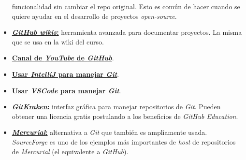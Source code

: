 \begin{itemize}
        funcionalidad sin cambiar el repo original.
        Esto es común de hacer cuando se quiere ayudar en el desarrollo de proyectos 
        \textit{open-source}.
      \item \href{https://guides.github.com/features/wikis/}{
        \textbf{\textit{GitHub wikis}:}} herramienta avanzada para documentar 
        proyectos.
        La misma que se usa en la wiki del curso. 
      \item \href{https://www.youtube.com/githubguides}{\textbf{Canal de 
        \textit{YouTube} de \textit{GitHub}}}.
      \item \href{https://www.youtube.com/watch?v=uUzRMOCBorg}{\textbf{Usar 
        \textit{IntelliJ} para manejar \textit{Git}}}.
      \item  \href{https://code.visualstudio.com/docs/editor/versioncontrol}{
        \textbf{Usar \textit{VSCode} para manejar \textit{Git}}}.
      \item \href{https://www.gitkraken.com}{\textbf{\textit{GitKraken}:}} interfaz 
        gráfica para manejar repositorios de \textit{Git}.
        Pueden obtener una licencia gratis postulando a los beneficios de 
        \textit{GitHub Education}.
      \item \href{https://www.mercurial-scm.org}{\textbf{\textit{Mercurial}:}} 
        alternativa a \textit{Git} que también es ampliamente usada.
        \textit{SourceForge} es uno de los ejemplos más importantes de \textit{host} 
        de repositorios de \textit{Mercurial} (el equivalente a \textit{GitHub}).
    \end{itemize}
%